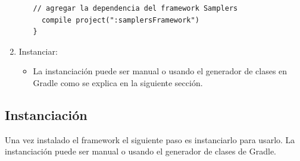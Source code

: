 \begin{enumerate}
\begin{itemize}
\begin{lstlisting}[language=XML, frame=tlb]
  // agregar la dependencia del framework Samplers
  compile project(":samplersFramework")
}
			\end{lstlisting}	
		\end{itemize}	

	\item Instanciar:
		\begin{itemize}
		\item La instanciación puede ser manual o usando el generador de clases en Gradle como se explica en la siguiente sección.
		\end{itemize}
\end{enumerate}	

\subsection{Instanciación}
Una vez instalado el framework el siguiente paso es instanciarlo para usarlo. La instanciación puede ser manual o usando el generador de clases de Gradle.

